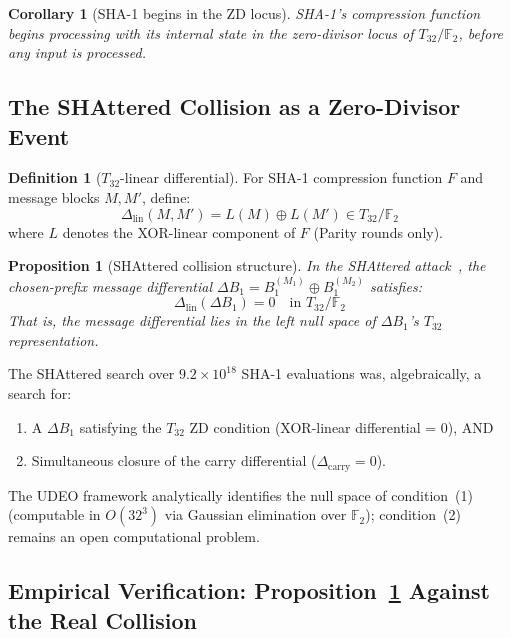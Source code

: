 \documentclass[runningheads]{llncs}
\theoremstyle{plain}
\newtheorem{corollary}[theorem]{Corollary}
\newtheorem{proposition}[theorem]{Proposition}
\theoremstyle{definition}
\newtheorem{definition}[theorem]{Definition}
\newcommand{\GFtwo}{\mathbb{F}_2}
\begin{document}
\begin{corollary}[SHA-1 begins in the ZD locus]
SHA-1's compression function begins processing with its internal state
in the zero-divisor locus of $T_{32}/\GFtwo$, before any input is processed.
\end{corollary}

\subsection{The SHAttered Collision as a Zero-Divisor Event}

\begin{definition}[$T_{32}$-linear differential]
For SHA-1 compression function $F$ and message blocks $M, M'$, define:
\[
\Delta_{\mathrm{lin}}(M, M') = L(M) \oplus L(M') \in T_{32}/\GFtwo
\]
where $L$ denotes the XOR-linear component of $F$ (Parity rounds only).
\end{definition}

\begin{proposition}[SHAttered collision structure]
\label{prop:shattered}
In the SHAttered attack~\cite{Stevens2017}, the chosen-prefix message
differential $\Delta B_1 = B_1^{(M_1)} \oplus B_1^{(M_2)}$ satisfies:
\[
\Delta_{\mathrm{lin}}(\Delta B_1) = 0 \quad \text{in } T_{32}/\GFtwo
\]
That is, the message differential lies in the left null space of $\Delta B_1$'s
$T_{32}$ representation.
\end{proposition}

The SHAttered search over $9.2 \times 10^{18}$ SHA-1 evaluations was,
algebraically, a search for:
\begin{enumerate}
\item A $\Delta B_1$ satisfying the $T_{32}$ ZD condition (XOR-linear differential = 0), AND
\item Simultaneous closure of the carry differential ($\Delta_{\mathrm{carry}} = 0$).
\end{enumerate}

The UDEO framework analytically identifies the null space of condition~(1)
(computable in $O(32^3)$ via Gaussian elimination over $\GFtwo$); condition~(2)
remains an open computational problem.

\subsection{Empirical Verification: Proposition~\ref{prop:shattered} Against the Real Collision}
\label{sec:shattered-verification}
\end{document}
